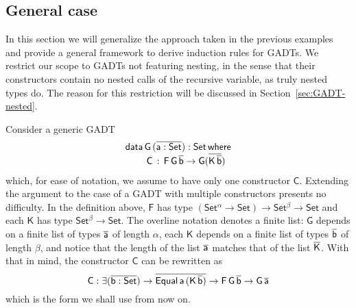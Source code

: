 \documentclass[acmsmall,screen,review,anonymous]{acmart}
\theoremstyle{definition}
\begin{document}

\subsection{General case}

In this section we will generalize the approach taken in the previous examples
and provide a general framework to derive induction rules for GADTs.
We restrict our scope to GADTs not featuring nesting,
in the sense that their constructors contain no nested calls of the recursive variable,
as truly nested types do.
The reason for this restriction will be discussed in Section~\ref{sec:GADT-nested}.

Consider a generic GADT
\begin{equation}\label{eq:gadt}
\begin{array}{l}
\mathsf{data\, G\,(\overline{a : Set}) : Set\,where}\\
\mathsf{\;\;\;\;\;\;\;\;C\, :\, F\,G\,\overline{b} \to G (\overline{K\,\overline{b}})}
\end{array}
\end{equation}
which, for ease of notation,
we assume to have only one constructor $\mathsf{C}$.
Extending the argument to the case of a GADT with multiple constructors presents no difficulty.
In the definition above, $\mathsf{F}$ has type $\mathsf{(Set^{\alpha} \to Set) \to Set^{\beta} \to Set}$
and each $\mathsf{K}$ has type $\mathsf{Set^{\beta} \to Set}$.
The overline notation denotes a finite list:
$\mathsf{G}$ depends on a finite list of types $\mathsf{\overline{a}}$ of length $\mathsf{\alpha}$,
each $\mathsf{K}$ depends on a finite list of types $\mathsf{\overline{b}}$ of length $\mathsf{\beta}$,
and notice that the length of the list $\mathsf{\overline{a}}$ matches that of the list $\mathsf{\overline{K}}$.
With that in mind, the constructor $\mathsf{C}$ can be rewritten as
\[
\mathsf{C : \exists (\overline{b : Set}) \to \overline{Equal\,a\,(K\,\overline{b})} \to F\,G\,\overline{b} \to G\,\overline{a}}
\]
which is the form we shall use from now on.
\end{document}
